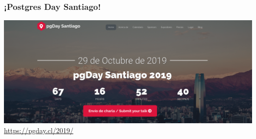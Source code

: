 \begin{frame}
  \frametitle{¡Postgres Day Santiago!}

  \center 

  \includegraphics[height=0.7\textheight]{pgday.png}
\url{https://pgday.cl/2019/}
\end{frame}
